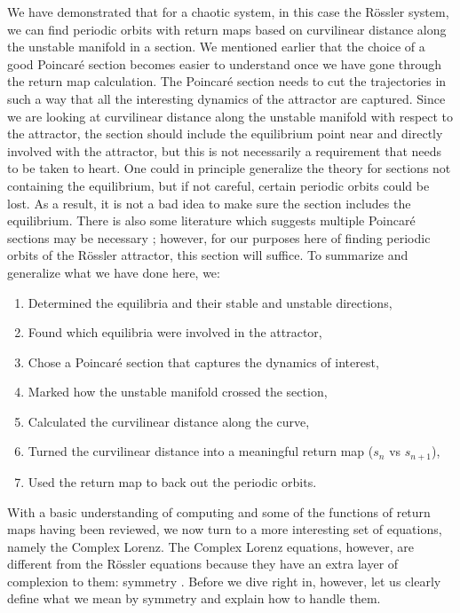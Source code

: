 \documentclass[aip,cha,reprint,
secnumarabic,
nofootinbib, tightenlines,
nobibnotes, showkeys, showpacs,
groupedaddress
]{revtex4-1}
\begin{document}
We have demonstrated that for a chaotic system, in this case the R\"ossler system, we can find periodic orbits with return maps based on curvilinear distance along the unstable manifold in a section. We mentioned earlier that the choice of a good Poincar\'e section becomes easier to understand once we have gone through the return map calculation.  The Poincar\'e section needs to cut the trajectories in such a way that all the interesting dynamics of the attractor are captured.  Since we are looking at curvilinear distance along the unstable manifold with respect to the attractor, the section should include the equilibrium point near and directly involved with the attractor, but this is not necessarily a requirement that needs to be taken to heart.  One could in principle generalize the theory for sections not containing the equilibrium, but if not careful, certain periodic orbits could be lost.  As a result, it is not a bad idea to make sure the section includes the equilibrium.  There is also some literature which suggests multiple Poincar\'e sections may be necessary \cite{Atl}; however, for our purposes here of finding periodic orbits of the R\"ossler attractor, this section will suffice.
To summarize and generalize what we have done here, we:
\begin{enumerate}
    \item Determined the equilibria and their stable and unstable directions,
    \item Found which equilibria were involved in the attractor,
    \item Chose a Poincar\'e section that captures the dynamics of interest,
    \item Marked how the unstable manifold crossed the section,
    \item Calculated the curvilinear distance along the curve,
    \item Turned the curvilinear distance into a meaningful return map ($s_{n}$ vs $s_{n+1}$),
    \item Used the return map to back out the periodic orbits.
\end{enumerate}

With a basic understanding of computing and some of the functions of return maps having been reviewed, we now turn to a more interesting set of equations, namely the Complex Lorenz.  The Complex Lorenz equations, however, are different from the R\"ossler equations because they have an extra layer of complexion to them: symmetry \cite{Eth}.  Before we dive right in, however, let us clearly define what we mean by symmetry and explain how to handle them.
\end{document}

